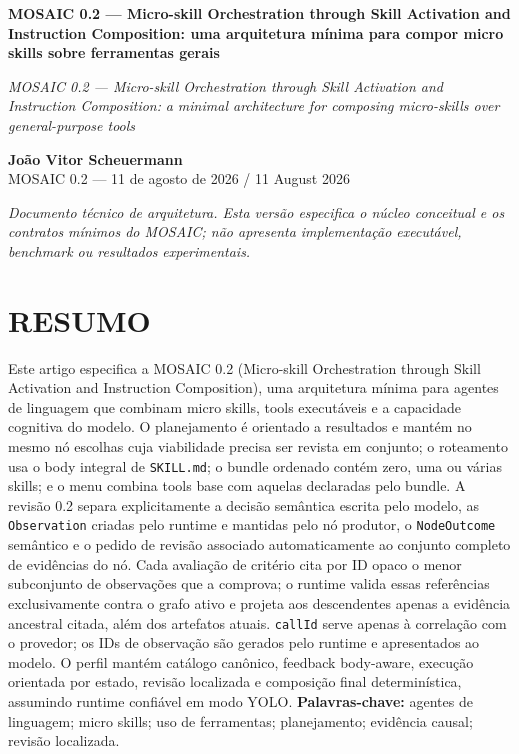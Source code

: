 \documentclass[12pt,a4paper]{article}
\begin{document}
\begin{center}\textbf{MOSAIC 0.2 — Micro-skill Orchestration through Skill Activation and Instruction Composition: uma arquitetura mínima para compor micro skills sobre ferramentas gerais}\par\end{center}

\textit{MOSAIC 0.2 — Micro-skill Orchestration through Skill Activation and Instruction Composition:} \textit{a minimal architecture for composing micro-skills over general-purpose tools}


\begin{center}\textbf{João Vitor Scheuermann}\\MOSAIC 0.2 — 11 de agosto de 2026 / 11 August 2026\end{center}

\textit{Documento técnico de arquitetura. Esta versão especifica o núcleo conceitual e os contratos} \textit{mínimos do MOSAIC; não apresenta implementação executável, benchmark ou resultados} \textit{experimentais.}


\section*{RESUMO}

Este artigo especifica a MOSAIC 0.2 (Micro-skill Orchestration through Skill Activation and Instruction Composition), uma arquitetura mínima para agentes de linguagem que combinam micro skills, tools executáveis e a capacidade cognitiva do modelo. O planejamento é orientado a resultados e mantém no mesmo nó escolhas cuja viabilidade precisa ser revista em conjunto; o roteamento usa o body integral de \texttt{SKILL.md}; o bundle ordenado contém zero, uma ou várias skills; e o menu combina tools base com aquelas declaradas pelo bundle. A revisão 0.2 separa explicitamente a decisão semântica escrita pelo modelo, as \texttt{Observation} criadas pelo runtime e mantidas pelo nó produtor, o \texttt{NodeOutcome} semântico e o pedido de revisão associado automaticamente ao conjunto completo de evidências do nó. Cada avaliação de critério cita por ID opaco o menor subconjunto de observações que a comprova; o runtime valida essas referências exclusivamente contra o grafo ativo e projeta aos descendentes apenas a evidência ancestral citada, além dos artefatos atuais. \texttt{callId} serve apenas à correlação com o provedor; os IDs de observação são gerados pelo runtime e apresentados ao modelo. O perfil mantém catálogo canônico, feedback body-aware, execução orientada por estado, revisão localizada e composição final determinística, assumindo runtime confiável em modo YOLO. \textbf{Palavras-chave:} agentes de linguagem; micro skills; uso de ferramentas; planejamento; evidência causal; revisão localizada.
\end{document}
